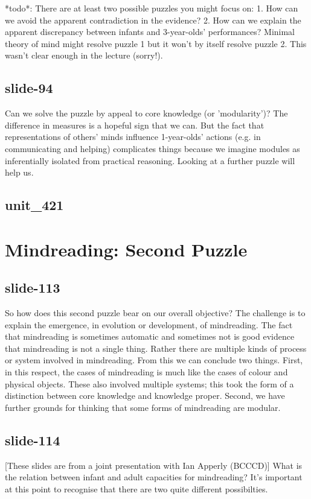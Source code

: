 \documentclass[12pt,\papersize]{extarticle}
\begin{document}
*todo*: There are at least two possible puzzles you might focus on:
1. How can we avoid the apparent contradiction in the evidence?
2. How can we explain the apparent discrepancy between infants and 3-year-olds' performances?
Minimal theory of mind might resolve puzzle 1 but it won't by itself resolve puzzle 2.
This wasn't clear enough in the lecture (sorry!).
 
 
\subsection{slide-94}
Can we solve the puzzle by appeal to core knowledge (or 'modularity')?
The difference in measures is a hopeful sign that we can.
But the fact that representations of others' minds influence 1-year-olds' actions (e.g. in communicating and helping) complicates things because we imagine modules as inferentially isolated from practical reasoning.
Looking at a further puzzle will help us.
 
 
\subsection{unit\_421}
 
\section{Mindreading: Second Puzzle}
 
 
\subsection{slide-113}
So how does this second puzzle bear on our overall objective?
The challenge is to explain the emergence, in evolution or development, of mindreading.
The fact that mindreading is sometimes automatic and sometimes not is good evidence that mindreading is not a single thing.
Rather there are multiple kinds of process or system involved in mindreading.
From this we can conclude two things.
First, in this respect, the cases of mindreading is much like the cases of colour and physical objects.
These also involved multiple systems; this took the form of a distinction between core knowledge and knowledge proper.
Second, we have further grounds for thinking that some forms of mindreading are modular.
 
 
\subsection{slide-114}
[These slides are from a joint presentation with Ian Apperly (BCCCD)]
What is the relation between infant and adult capacities for mindreading?
It's important at this point to recognise that there are two quite different possibilties.
 
\end{document}

